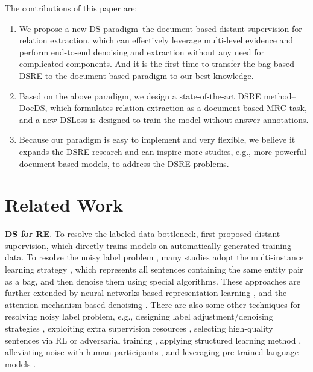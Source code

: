 \documentclass[11pt,a4paper]{article}
\begin{document}
  The contributions of this paper are:
  \begin{enumerate}
  \item We propose a new DS paradigm--the document-based distant supervision for relation extraction, which can effectively leverage multi-level evidence and perform end-to-end denoising and extraction without any need for complicated components. And it is the first time to transfer the bag-based DSRE to the document-based paradigm to our best knowledge.
  \item Based on the above paradigm, we design a state-of-the-art DSRE method--DocDS, which formulates relation extraction as a document-based MRC task, and a new DSLoss is designed to train the model without answer annotations.
   \item Because our paradigm is easy to implement and very flexible, we believe it expands the DSRE research and can inspire more studies, e.g., more powerful document-based models, to address the DSRE problems.
  \end{enumerate}
  
  \section{Related Work}
  \textbf{DS for RE}. To resolve the labeled data bottleneck, \citet{mintz_distant_2009} first proposed distant supervision, which directly trains models on automatically generated training data.
  To resolve the noisy label problem \cite{riedel_modeling_2010,han_global_2016}, many studies adopt the multi-instance learning strategy \cite{riedel_modeling_2010, hoffmann_knowledgebased_2011,surdeanu_multiinstance_2012}, which represents all sentences containing the same entity pair as a bag, and then denoise them using special algorithms. These approaches are further extended by neural networks-based representation learning \cite{zeng_distant_2015,lin_neural_2016,feng_effective_2017,ji_distant_2017}, and the attention mechanism-based denoising \cite{lin_neural_2016,ji_distant_2017,du_multilevel_2018,han_global_2016, yuan_distant_2018, yuan_crossrelation_2018,jia_arnor_2019, ye_distant_2019, xing_distant_2019, chen_uncover_2019}.
  There are also some other techniques for resolving noisy label problem, e.g.,
  designing label adjustment/denoising strategies \cite{liu_softlabel_2017,luo_learning_2017,chen_uncover_2019},
  exploiting extra supervision resources \cite{lei_cooperative_2018,vashishth_reside_2018,wang_labelfree_2018,deng_leveraging_2019},
  selecting high-quality sentences via RL or adversarial training \cite{feng_reinforcement_2018,qin_dsgan_2018},
  applying structured learning method \cite{bai_structured_2019},
  alleviating noise with human participants \cite{zheng_diagnre_2019},
  and leveraging pre-trained language models \cite{alt_finetuning_2019}.
  
\end{document}
